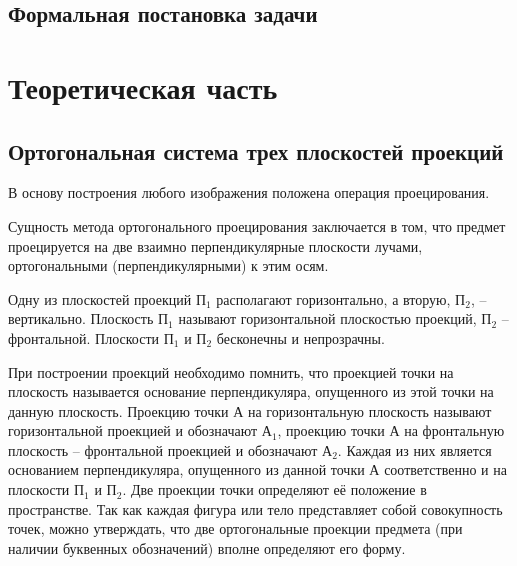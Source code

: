 \documentclass[13pt]{extarticle}
\begin{document}
\subsection{Формальная постановка задачи}
	\begin{figure}[h]
	\end{figure}
	
\section{Теоретическая часть}
\subsection{Ортогональная система трех плоскостей проекций}
В основу построения любого изображения положена операция проецирования.

Сущность метода ортогонального проецирования заключается в том, что предмет проецируется на две взаимно перпендикулярные плоскости лучами, ортогональными (перпендикулярными) к этим осям.

Одну из плоскостей проекций П$_1$ располагают горизонтально, а вторую, П$_2$, -- вертикально. Плоскость П$_1$ называют горизонтальной плоскостью проекций, П$_2$ -- фронтальной. Плоскости П$_1$ и П$_2$ бесконечны и непрозрачны.

При построении проекций необходимо помнить, что проекцией точки на плоскость называется основание перпендикуляра, опущенного из этой точки на данную плоскость. Проекцию точки А на горизонтальную плоскость называют горизонтальной проекцией и обозначают А$_1$, проекцию точки А на фронтальную плоскость -- фронтальной проекцией и обозначают А$_2$. Каждая из них является основанием перпендикуляра, опущенного из данной точки А соответственно и на плоскости П$_1$ и П$_2$. Две проекции точки определяют её положение в пространстве. Так как каждая фигура или тело представляет собой совокупность точек, можно утверждать, что две ортогональные проекции предмета (при наличии буквенных обозначений) вполне определяют его форму.
\end{document}
